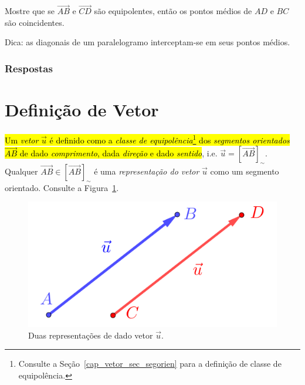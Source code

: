 \begin{exer}
  Mostre que se $\overrightarrow{AB}$ e $\overrightarrow{CD}$ são equipolentes, então os pontos médios de $AD$ e $BC$ são coincidentes.
\end{exer}
\begin{resp}
  Dica: as diagonais de um paralelogramo interceptam-se em seus pontos médios.
\end{resp}

\ifisbook
\subsubsection{Respostas}
\shipoutAnswer
\fi

\section{Definição de Vetor}\label{cap_vetor_sec_vetor}


\hl{Um \emph{vetor} $\vec{u}$ é definido como a \emph{classe de equipolência}\footnote{Consulte a Seção~\ref{cap_vetor_sec_segorien} para a definição de classe de equipolência.} dos \emph{segmentos orientados} $\overrightarrow{AB}$ de dado \emph{comprimento}, dada \emph{direção} e dado \emph{sentido}}, i.e. $\vec{u} = \left[\overrightarrow{AB}\right]_{\sim}$. Qualquer $\overrightarrow{AB}\in \left[\overrightarrow{AB}\right]_{\sim}$ é uma \emph{representação do vetor} $\vec{u}$ como um segmento orientado. Consulte a Figura~\ref{cap_vetor_sec_vetor:fig:vetor}.

\begin{figure}[h]
  \centering
  \includegraphics{./cap_vetor/dados/fig_vetor/fig.png}
  \caption{Duas representações de dado vetor $\vec{u}$.}
  \label{cap_vetor_sec_vetor:fig:vetor}
\end{figure}

